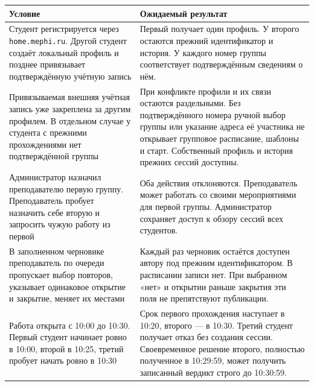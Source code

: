 \documentclass[12pt,a4paper]{article}
\begin{document}
{\def\LTcaptype{none} %
\begin{longtable}[]{@{}
  >{\raggedright\arraybackslash}p{}
  >{\raggedright\arraybackslash}p{}@{}}
\toprule\noalign{}
\begin{minipage}[b]{\linewidth}\raggedright
Условие
\end{minipage} & \begin{minipage}[b]{\linewidth}\raggedright
Ожидаемый результат
\end{minipage} \\
\midrule\noalign{}
\endhead
\bottomrule\noalign{}
\endlastfoot
Студент регистрируется через \texttt{home.\allowbreak{}mephi.\allowbreak{}ru}. Другой студент создаёт локальный профиль и позднее привязывает подтверждённую учётную запись & Первый получает один профиль. У второго остаются прежний идентификатор и история. У каждого номер группы соответствует подтверждённым сведениям о нём. \\
Привязываемая внешняя учётная запись уже закреплена за другим профилем. В отдельном случае у студента с прежними прохождениями нет подтверждённой группы & При конфликте профили и их связи остаются раздельными. Без подтверждённого номера ручной выбор группы или указание адреса её участника не открывает групповое расписание, шаблоны и старт. Собственный профиль и история прежних сессий доступны. \\
Администратор назначил преподавателю первую группу. Преподаватель пробует назначить себе вторую и запросить чужую работу из первой & Оба действия отклоняются. Преподаватель может работать со своими мероприятиями для первой группы. Администратор сохраняет доступ к обзору сессий всех студентов. \\
В заполненном черновике преподаватель по очереди пропускает выбор повторов, указывает одинаковое открытие и закрытие, меняет их местами & Каждый раз черновик остаётся доступен автору под прежним идентификатором. В расписании записи нет. При выбранном «нет» и открытии раньше закрытия эти поля не препятствуют публикации. \\
Работа открыта с 10:00 до 10:30. Первый студент начинает ровно в 10:00, второй в 10:25, третий пробует начать ровно в 10:30 & Срок первого прохождения наступает в 10:20, второго --- в 10:30. Третий студент получает отказ без создания сессии. Своевременное решение второго, полностью полученное в 10:29:59, может получить записанный вердикт строго до 10:30:59. \\

\end{longtable}}
\end{document}
